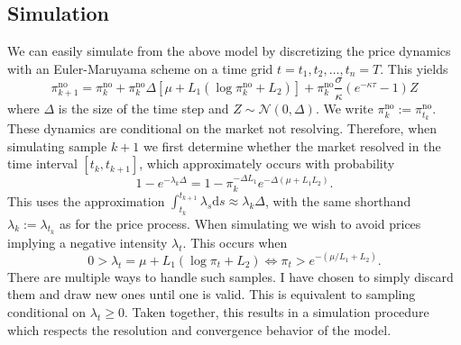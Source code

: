 \documentclass[a4paper, 12pt]{article}
\begin{document}
\subsection{Simulation}
We can easily simulate from the above model by discretizing the price dynamics with an Euler-Maruyama scheme on a time grid \(t=t_1, t_2, \dots, t_n = T\). This yields
\begin{equation*}
  \pi^\text{no}_{k+1} = \pi_k^\text{no} + \pi_k^\text{no}\Delta\left[\mu + L_1(\log\pi^\text{no}_k + L_2)\right] + \pi^\text{no}_k \frac{\sigma}{\kappa}(e^{-\kappa\tau}-1)Z
\end{equation*}
where \(\Delta\) is the size of the time step and \(Z \sim \mathcal{N}(0, \Delta)\). We write \(\pi_k^\text{no} := \pi_{t_k}^\text{no} \). These dynamics are conditional on the market not resolving. Therefore, when simulating sample \(k+1\) we first determine whether the market resolved in the time interval \([t_k, t_{k+1}]\), which approximately occurs with probability
\begin{equation*}
  1 - e^{-\lambda_k\Delta } = 1 - \pi_k^{-\Delta L_1}e^{-\Delta (\mu +L_1L_2)}.
\end{equation*}
This uses the approximation \(\int_{t_k}^{t_{k+1}}\lambda_s\mathrm{d}s \approx \lambda_k\Delta\), with the same shorthand \(\lambda_k := \lambda_{t_k}\) as for the price process. When simulating we wish to avoid prices implying a negative intensity \(\lambda_t\). This occurs when
\begin{equation*}
0 > \lambda_t = \mu + L_1(\log\pi_t + L_2) \iff \pi_t > e^{-(\mu / L_1 + L_2)}.
\end{equation*}
There are multiple ways to handle such samples. I have chosen to simply discard them and draw new ones until one is valid. This is equivalent to sampling conditional on \(\lambda_t \geq 0\). Taken together, this results in a simulation procedure which respects the resolution and convergence behavior of the model.
\end{document}
